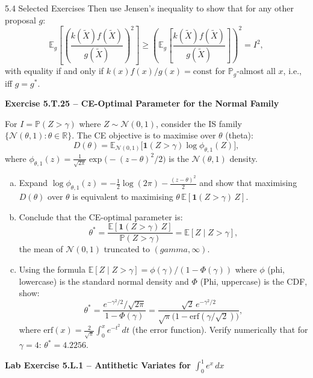 \documentclass[aspectratio=169,10pt]{beamer}
\begin{document}
\begin{frame}[allowframebreaks]{5.4 Selected Exercises}
Then use Jensen's inequality to show that for any other proposal $g$:
\[
  \mathbb{E}_g\!\left[\left(\frac{k(\tilde{X})f(\tilde{X})}{g(\tilde{X})}\right)^2\right]
  \ge \left(\mathbb{E}_g\!\left[\frac{k(\tilde{X})f(\tilde{X})}{g(\tilde{X})}\right]\right)^2 = I^2,
\]
with equality if and only if $k(x)f(x)/g(x) = \text{const}$ for $\mathbb{P}_g$-almost
all $x$, i.e., iff $g = g^*$.

\framebreak

\textbf{Exercise 5.T.25 -- CE-Optimal Parameter for the Normal Family}

For $I = \mathbb{P}(Z > \gamma)$ where $Z \sim \mathcal{N}(0,1)$, consider the IS
family $\{\mathcal{N}(\theta, 1) : \theta \in \mathbb{R}\}$.  The CE objective
is to maximise over $\theta$ (theta):
\[
  D(\theta) = \mathbb{E}_{\mathcal{N}(0,1)}\!\bigl[\mathbf{1}(Z > \gamma)\log\phi_{\theta,1}(Z)\bigr],
\]
where $\phi_{\theta,1}(z) = \frac{1}{\sqrt{2\pi}}\exp\!\bigl(-(z-\theta)^2/2\bigr)$
is the $\mathcal{N}(\theta, 1)$ density.

\begin{enumerate}[(a)]
  \item Expand $\log\phi_{\theta,1}(z) = -\frac{1}{2}\log(2\pi) - \frac{(z-\theta)^2}{2}$
        and show that maximising $D(\theta)$ over $\theta$ is equivalent to
        maximising $\theta\,\mathbb{E}[\mathbf{1}(Z>\gamma)\,Z]$.

  \item Conclude that the CE-optimal parameter is:
        \[
          \theta^* = \frac{\mathbb{E}[\mathbf{1}(Z>\gamma)\,Z]}{\mathbb{P}(Z>\gamma)}
                   = \mathbb{E}[Z \mid Z > \gamma],
        \]
        the mean of $\mathcal{N}(0,1)$ truncated to $(gamma, \infty)$.

  \item Using the formula $\mathbb{E}[Z \mid Z > \gamma] = \phi(\gamma) / (1 - \Phi(\gamma))$
        where $\phi$ (phi, lowercase) is the standard normal density and
        $\Phi$ (Phi, uppercase) is the CDF, show:
        \[
          \theta^* = \frac{e^{-\gamma^2/2}/\sqrt{2\pi}}{1 - \Phi(\gamma)}
                   = \frac{\sqrt{2}\,e^{-\gamma^2/2}}{\sqrt{\pi}\bigl(1 - \mathrm{erf}(\gamma/\sqrt{2})\bigr)},
        \]
        where $\mathrm{erf}(x) = \frac{2}{\sqrt{\pi}}\int_0^x e^{-t^2}\,dt$ (the error function).
        Verify numerically that for $\gamma = 4$: $\theta^* = 4.2256$.
\end{enumerate}

\framebreak

\textbf{Lab Exercise 5.L.1 -- Antithetic Variates for $\int_0^1 e^x\,dx$}


\end{frame}
\end{document}

